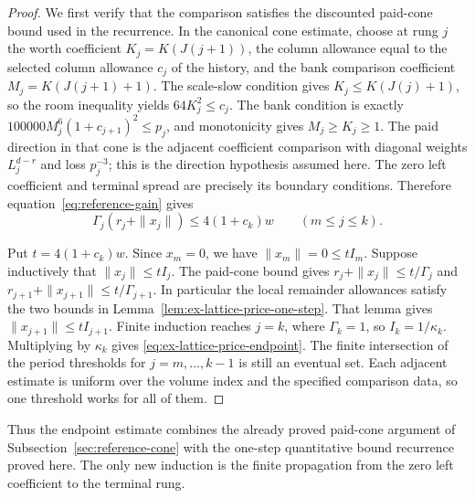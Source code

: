 \begin{proof}
We first verify that the comparison satisfies the discounted paid-cone
bound used in the recurrence. In the canonical cone estimate, choose at
rung \(j\) the worth coefficient
\(K_j=K(J(j+1))\), the column allowance equal to the selected column
allowance \(c_j\) of the history, and the bank comparison coefficient
\(M_j=K(J(j+1)+1)\). The scale-slow condition gives
\(K_j\leq K(J(j)+1)\), so the room inequality yields
\(64K_j^2\leq c_j\). The bank condition is exactly
\(100000M_j^6(1+c_{j+1})^2\leq p_j\), and monotonicity gives
\(M_j\geq K_j\geq1\). The paid direction in that cone is the adjacent
coefficient comparison with diagonal weights \(L_j^{d-r}\) and loss
\(p_j^{-3}\); this is the direction hypothesis assumed here. The zero
left coefficient and terminal spread are precisely its boundary
conditions. Therefore equation~\eqref{eq:reference-gain} gives
\begin{equation}
 \Gamma_j(r_j+\|x_j\|)\leq4(1+c_k)w
       \qquad(m\leq j\leq k).
 \label{eq:ex-lattice-price-cone}
\end{equation}

Put \(t=4(1+c_k)w\). Since \(x_m=0\), we have
\(\|x_m\|=0\leq tI_m\). Suppose inductively that
\(\|x_j\|\leq tI_j\). The paid-cone bound gives
\(r_j+\|x_j\|\leq t/\Gamma_j\) and
\(r_{j+1}+\|x_{j+1}\|\leq t/\Gamma_{j+1}\). In particular the local
remainder allowances satisfy the two bounds in Lemma~\ref{lem:ex-lattice-price-one-step}.
That lemma gives \(\|x_{j+1}\|\leq tI_{j+1}\). Finite induction reaches
\(j=k\), where \(\Gamma_k=1\), so \(I_k=1/\kappa_k\). Multiplying by \(\kappa_k\)
gives \eqref{eq:ex-lattice-price-endpoint}. The finite intersection of the
period thresholds for \(j=m,\ldots,k-1\) is still an eventual set. Each
adjacent estimate is uniform over the volume index and the specified
comparison data, so one
threshold works for all of them.
\end{proof}

Thus the endpoint estimate combines the already proved paid-cone argument
of Subsection~\ref{sec:reference-cone} with the one-step quantitative bound
recurrence proved here. The only new induction is the finite propagation
from the zero left coefficient to the terminal rung.
